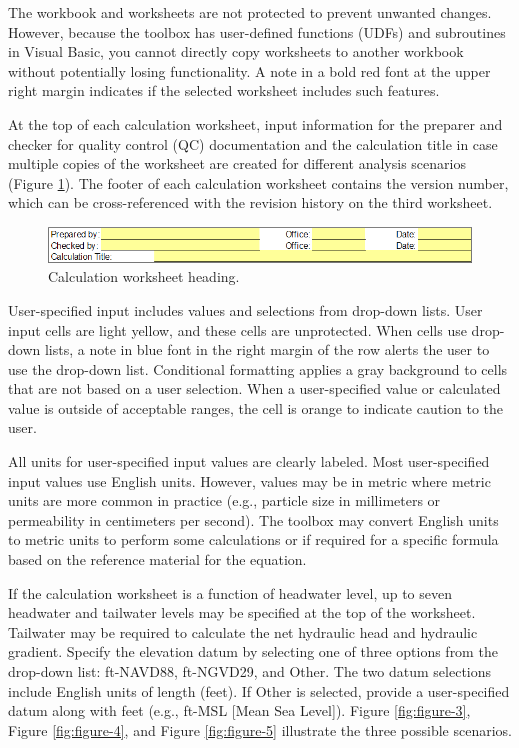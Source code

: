 \documentclass[
]{book}
\begin{document}
The workbook and worksheets are not protected to prevent unwanted changes. However, because the toolbox has user-defined functions (UDFs) and subroutines in Visual Basic, you cannot directly copy worksheets to another workbook without potentially losing functionality. A note in a bold red font at the upper right margin indicates if the selected worksheet includes such features.

At the top of each calculation worksheet, input information for the preparer and checker for quality control (QC) documentation and the calculation title in case multiple copies of the worksheet are created for different analysis scenarios (Figure \ref{fig:figure-2}). The footer of each calculation worksheet contains the version number, which can be cross-referenced with the revision history on the third worksheet.

\begin{figure}

{\centering \includegraphics[width=1\linewidth]{images/figure2} 

}

\caption{Calculation worksheet heading.}\label{fig:figure-2}
\end{figure}

User-specified input includes values and selections from drop-down lists. User input cells are light yellow, and these cells are unprotected. When cells use drop-down lists, a note in blue font in the right margin of the row alerts the user to use the drop-down list. Conditional formatting applies a gray background to cells that are not based on a user selection. When a user-specified value or calculated value is outside of acceptable ranges, the cell is orange to indicate caution to the user.

All units for user-specified input values are clearly labeled. Most user-specified input values use English units. However, values may be in metric where metric units are more common in practice (e.g., particle size in millimeters or permeability in centimeters per second). The toolbox may convert English units to metric units to perform some calculations or if required for a specific formula based on the reference material for the equation.

If the calculation worksheet is a function of headwater level, up to seven headwater and tailwater levels may be specified at the top of the worksheet. Tailwater may be required to calculate the net hydraulic head and hydraulic gradient. Specify the elevation datum by selecting one of three options from the drop-down list: ft-NAVD88, ft-NGVD29, and Other. The two datum selections include English units of length (feet). If Other is selected, provide a user-specified datum along with feet (e.g., ft-MSL {[}Mean Sea Level{]}). Figure \ref{fig:figure-3}, Figure \ref{fig:figure-4}, and Figure \ref{fig:figure-5} illustrate the three possible scenarios.
\end{document}
